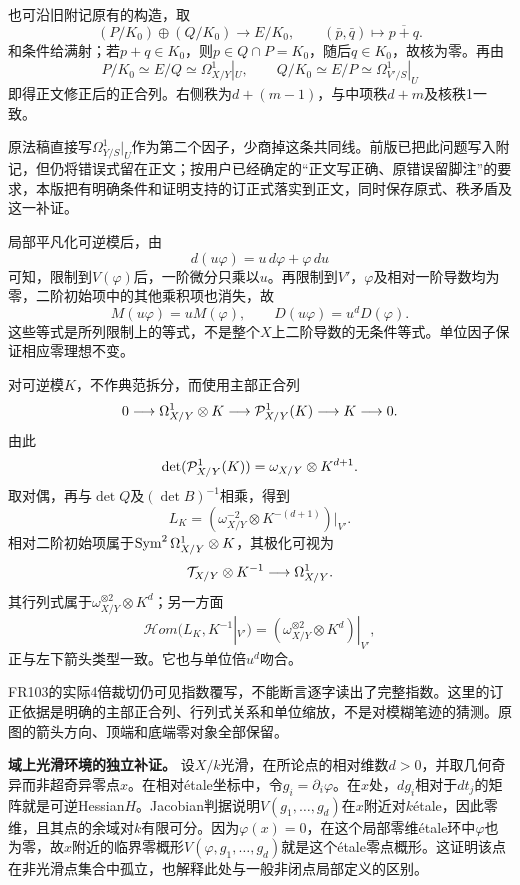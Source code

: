 也可沿旧附记原有的构造，取
\[
 (P/K_0)\oplus(Q/K_0)\longrightarrow E/K_0,
 \qquad(\bar p,\bar q)\longmapsto\overline{p+q}.
\]
和条件给满射；若$p+q\in K_0$，则$p\in Q\cap P=K_0$，随后$q\in K_0$，故核为零。再由
\[
 P/K_0\simeq E/Q\simeq\Omega^1_{X/Y}|_U,
 \qquad Q/K_0\simeq E/P\simeq\Omega^1_{V'/S}|_U
\]
即得正文修正后的正合列。右侧秩为$d+(m-1)$，与中项秩$d+m$及核秩1一致。

原法稿直接写$\Omega^1_{Y/S}|_U$作为第二个因子，少商掉这条共同线。前版已把此问题写入附记，但仍将错误式留在正文；按用户已经确定的“正文写正确、原错误留脚注”的要求，本版把有明确条件和证明支持的订正式落实到正文，同时保存原式、秩矛盾及这一补证。

局部平凡化可逆模后，由
\[
 d(u\varphi)=u\,d\varphi+\varphi\,du
\]
可知，限制到$V(\varphi)$后，一阶微分只乘以$u$。再限制到$V'$，$\varphi$及相对一阶导数均为零，二阶初始项中的其他乘积项也消失，故
\[
 M(u\varphi)=uM(\varphi),\qquad
 D(u\varphi)=u^dD(\varphi).
\]
这些等式是所列限制上的等式，不是整个$X$上二阶导数的无条件等式。单位因子保证相应零理想不变。

对可逆模$K$，不作典范拆分，而使用主部正合列
\[
 0\longrightarrow\Omega^1_{X/Y}\otimes K
 \longrightarrow\mathcal P^1_{X/Y}(K)\longrightarrow K\longrightarrow0.
\]
由此
\[
 \det(\mathcal P^1_{X/Y}(K))
       =\omega_{X/Y}\otimes K^{d+1}.
\]
取对偶，再与$\det Q$及$(\det B)^{-1}$相乘，得到
\[
 L_K=(\omega_{X/Y}^{-2}\otimes K^{-(d+1)})|_{V'}.
\]
相对二阶初始项属于$\operatorname{Sym}^2\Omega^1_{X/Y}\otimes K$，其极化可视为
\[
 \mathcal T_{X/Y}\otimes K^{-1}\longrightarrow\Omega^1_{X/Y}.
\]
其行列式属于$\omega_{X/Y}^{\otimes2}\otimes K^d$；另一方面
\[
 \mathscr Hom(L_K,K^{-1}|_{V'})
  =(\omega_{X/Y}^{\otimes2}\otimes K^d)|_{V'},
\]
正与左下箭头类型一致。它也与单位倍$u^d$吻合。

FR103的实际4倍裁切仍可见指数覆写，不能断言逐字读出了完整指数。这里的订正依据是明确的主部正合列、行列式关系和单位缩放，不是对模糊笔迹的猜测。原图的箭头方向、顶端和底端零对象全部保留。

\noindent\textbf{域上光滑环境的独立补证。}
设$X/k$光滑，在所论点的相对维数$d>0$，并取几何奇异而非超奇异零点$x$。在相对étale坐标中，令$g_i=\partial_i\varphi$。在$x$处，$dg_i$相对于$dt_j$的矩阵就是可逆Hessian$H$。Jacobian判据说明$V(g_1,\ldots,g_d)$在$x$附近对$k$étale，因此零维，且其点的余域对$k$有限可分。因为$\varphi(x)=0$，在这个局部零维étale环中$\varphi$也为零，故$x$附近的临界零概形$V(\varphi,g_1,\ldots,g_d)$就是这个étale零点概形。这证明该点在非光滑点集合中孤立，也解释此处与一般非闭点局部定义的区别。

